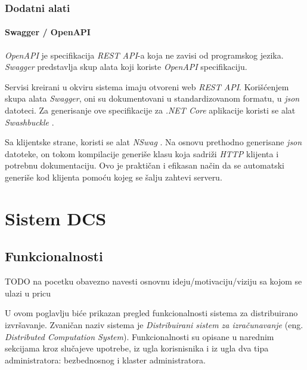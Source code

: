 \documentclass[12pt,oneside]{memoir}
\begin{document}
\subsection{Dodatni alati}

\subsubsection{Swagger / OpenAPI}

\emph{OpenAPI} \cite{OpenAPI} je specifikacija \emph{REST API}-a koja ne zavisi od programskog jezika. \emph{Swagger} \cite{Swagger} predstavlja skup alata koji koriste \emph{OpenAPI} specifikaciju.

Servisi kreirani u okviru sistema imaju otvoreni web \emph{REST API}. Korišćenjem skupa alata \emph{Swagger}, oni su dokumentovani u standardizovanom formatu, u \emph{json} datoteci. Za generisanje ove specifikacije za \emph{.NET Core} aplikacije koristi se alat \emph{Swashbuckle} \cite{Swashbuckle}.

Sa klijentske strane, koristi se alat \emph{NSwag} \cite{NSwag}. Na osnovu prethodno generisane \emph{json} datoteke, on tokom kompilacije generiše klasu koja sadriži \emph{HTTP} klijenta i potrebnu dokumentaciju. Ovo je praktičan i efikasan način da se automatski generiše kod klijenta pomoću kojeg se šalju zahtevi serveru.



\chapter{Sistem DCS}
\label{chp:sistemdcs}



\section{Funkcionalnosti}
\label{chp:opisfunkc}

TODO na pocetku obavezno navesti osnovnu ideju/motivaciju/viziju sa kojom se ulazi u pricu

U ovom poglavlju biće prikazan pregled funkcionalnosti sistema za distribuirano izvršavanje. Zvaničan naziv sistema je \emph{Distribuirani sistem za izračunavanje} (eng. \emph{Distributed Computation System}).
Funkcionalnosti su opisane u narednim sekcijama kroz slučajeve upotrebe, iz ugla korisnisnika i iz ugla dva tipa administratora: bezbednosnog i klaster administratora.
\end{document}
